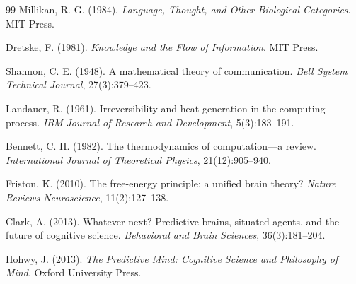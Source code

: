 \documentclass[11pt,a4paper]{article}
\begin{document}
\begin{thebibliography}{99}
Millikan, R. G. (1984). \textit{Language, Thought, and Other Biological Categories}. MIT Press.

Dretske, F. (1981). \textit{Knowledge and the Flow of Information}. MIT Press.

Shannon, C. E. (1948). A mathematical theory of communication. \textit{Bell System Technical Journal}, 27(3):379--423.

Landauer, R. (1961). Irreversibility and heat generation in the computing process. \textit{IBM Journal of Research and Development}, 5(3):183--191.

Bennett, C. H. (1982). The thermodynamics of computation—a review. \textit{International Journal of Theoretical Physics}, 21(12):905--940.

Friston, K. (2010). The free-energy principle: a unified brain theory? \textit{Nature Reviews Neuroscience}, 11(2):127--138.

Clark, A. (2013). Whatever next? Predictive brains, situated agents, and the future of cognitive science. \textit{Behavioral and Brain Sciences}, 36(3):181--204.

Hohwy, J. (2013). \textit{The Predictive Mind: Cognitive Science and Philosophy of Mind}. Oxford University Press.

\end{thebibliography}
\end{document}
